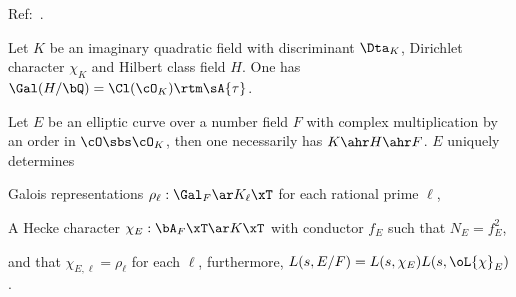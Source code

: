 \documentclass[a4paper, twoside]{article}
\begin{document}




Ref:~\cite{Gross1980,Cox2013}.

\begin{stp}
	Let $K$ be an imaginary quadratic field with discriminant $\Dta_{K}$, Dirichlet character $\chi_{K}$ and Hilbert class field $H$. One has $\Gal(H/\bQ)=\Cl(\cO_{K})\rtm\sA{\tau}$.
\end{stp}


\begin{thm}
	Let $E$ be an elliptic curve over a number field $F$ with complex multiplication by an order in $\cO\sbs\cO_{K}$, then one necessarily has $K\ahr H\ahr F$. $E$ uniquely determines
	\begin{itm}
		\item Galois representations $\rho_{\ell}:\Gal_{F}\ar K_{\ell}\xT$ for each rational prime $\ell$,
		\item A Hecke character $\chi_{E}:\bA_{F}\xT\ar K\xT$ with conductor $f_{E}$ such that $N_{E}=f_{E}^{2}$,
	\end{itm}
	and that $\chi_{E,\ell}=\rho_{\ell}$ for each $\ell$, furthermore, $L(s,E/F)=L(s,\chi_{E})L(s,\oL{\chi}_{E})$.
\end{thm}
\end{document}
